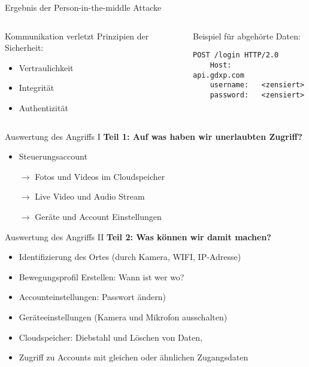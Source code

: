 \documentclass[11pt, aspectratio=169, modernfonts]{beamer}
\begin{document}
    \begin{frame}[fragile]{Ergebnis der Person-in-the-middle Attacke}
        \begin{columns}
            \begin{column}{0.5\textwidth}
                Kommunikation verletzt Prinzipien der Sicherheit:
                \begin{itemize}
                    \item Vertraulichkeit
                    \item Integrität
                    \item Authentizität
                \end{itemize}
            \end{column}
            \break
            \begin{column}{0.5\textwidth}
                Beispiel für abgehörte Daten:
                \begin{lstlisting}[basicstyle=\ttfamily, label={lst:sign-in}]
POST /login HTTP/2.0
    Host:       api.gdxp.com
    username:   <zensiert>
    password:   <zensiert>
                \end{lstlisting}
            \end{column}

        \end{columns}
    \end{frame}

    \begin{frame}{Auswertung des Angriffs I}
        \textbf{Teil 1: Auf was haben wir unerlaubten Zugriff?}\\[0.2cm]
        \begin{itemize}
            \item Steuerungsaccount
            \item[$\rightarrow$] Fotos und Videos im Cloudspeicher
            \item[$\rightarrow$] Live Video und Audio Stream
            \item[$\rightarrow$] Geräte und Account Einstellungen
        \end{itemize}
    \end{frame}


    \begin{frame}{Auswertung des Angriffs II}
        \textbf{Teil 2: Was können wir damit machen?}\\[0.2cm]
        \begin{itemize}
            \item Identifizierung des Ortes (durch Kamera, WIFI, IP-Adresse)
            \item Bewegungsprofil Erstellen: Wann ist wer wo?
            \item Accounteinstellungen: Passwort ändern)
            \item Geräteeinstellungen (Kamera und Mikrofon ausschalten)
            \item Cloudspeicher: Diebstahl und Löschen von Daten,
            \item Zugriff zu Accounts mit gleichen oder ähnlichen Zugangsdaten
        \end{itemize}
    \end{frame}
\end{document}
